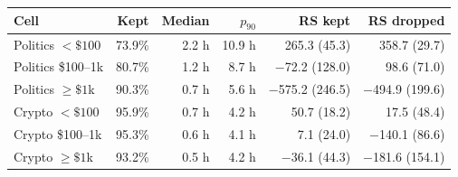 \begin{tabular}{lrrrrr}
\toprule
Cell & Kept & Median & $p_{90}$ & RS kept & RS dropped \\
\midrule
Politics $<\$100$ & 73.9\% & 2.2 h & 10.9 h & 265.3 (45.3) & 358.7 (29.7) \\
Politics \$100--1k & 80.7\% & 1.2 h & 8.7 h & \ensuremath{-}72.2 (128.0) & 98.6 (71.0) \\
Politics $\ge\$1$k & 90.3\% & 0.7 h & 5.6 h & \ensuremath{-}575.2 (246.5) & \ensuremath{-}494.9 (199.6) \\
Crypto $<\$100$ & 95.9\% & 0.7 h & 4.2 h & 50.7 (18.2) & 17.5 (48.4) \\
Crypto \$100--1k & 95.3\% & 0.6 h & 4.1 h & 7.1 (24.0) & \ensuremath{-}140.1 (86.6) \\
Crypto $\ge\$1$k & 93.2\% & 0.5 h & 4.2 h & \ensuremath{-}36.1 (44.3) & \ensuremath{-}181.6 (154.1) \\
\bottomrule
\end{tabular}

